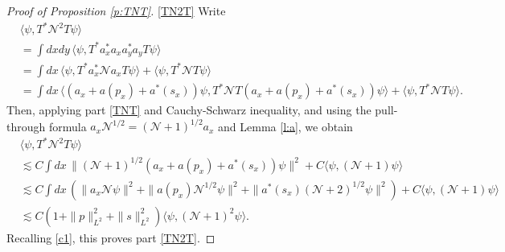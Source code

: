 \documentclass[11pt,a4paper]{scrartcl}
\newcommand{\N}{\mathcal{N}}
\begin{document}
\begin{proof}[Proof of Proposition \ref{p:TNT}]
  \eqref{TN2T} Write
  \begin{align*}
    & \langle \psi, T^* \N^2 T \psi \rangle \\
    & = \int dxdy \, \langle \psi, T^* a_x^* a_x a_y^* a_y T \psi \rangle \\
    & = \int dx \, \langle \psi, T^* a_x^* \N a_x T \psi \rangle + \langle
    \psi, T^* \N T \psi \rangle \\
    & = \int dx \, \langle (a_x + a(p_x) + a^*(s_x)) \psi, T^* \N T (a_x +
    a(p_x) + a^*(s_x)) \psi \rangle + \langle \psi, T^* \N T \psi \rangle.
  \end{align*}
  Then, applying part \eqref{TNT} and Cauchy-Schwarz inequality, and using the
  pull-through formula $a_x \N^{1/2} = (\N+1)^{1/2} a_x$ and Lemma \ref{l:a},
  we obtain
  \begin{align*}
    & \langle \psi, T^* \N^2 T \psi \rangle \\
    & \apprle C \int dx \, \| (\N+1)^{1/2} (a_x + a(p_x) +
    a^*(s_x)) \psi \|^2 + C \langle \psi, (\N+1) \psi \rangle \\
    & \apprle C \int dx \, (\| a_x \N \psi \|^2 + \| a(p_x)
    \N^{1/2} \psi \|^2 + \| a^*(s_x) (\N+2)^{1/2} \psi \|^2 ) + C \langle
    \psi, (\N+1) \psi \rangle \\
    & \apprle C(1 + \| p \|_{L^2}^2 + \| s \|_{L^2}^2) \langle \psi, (\N+1)^2
    \psi \rangle.
  \end{align*}
  Recalling \eqref{c1}, this proves part \eqref{TN2T}.



\end{proof}
\end{document}
